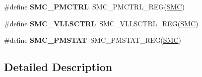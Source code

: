 \begin{DoxyCompactItemize}
\item 
\#define {\bfseries S\+M\+C\+\_\+\+P\+M\+C\+T\+RL}~S\+M\+C\+\_\+\+P\+M\+C\+T\+R\+L\+\_\+\+R\+EG(\hyperlink{group__SMC__Peripheral__Access__Layer_ga6667e81e5b32250febd3d46511d9309d}{S\+MC})\hypertarget{group__SMC__Register__Accessor__Macros_ga4b2bae0309aecee21e9fe70ac7dbe3dc}{}\label{group__SMC__Register__Accessor__Macros_ga4b2bae0309aecee21e9fe70ac7dbe3dc}

\item 
\#define {\bfseries S\+M\+C\+\_\+\+V\+L\+L\+S\+C\+T\+RL}~S\+M\+C\+\_\+\+V\+L\+L\+S\+C\+T\+R\+L\+\_\+\+R\+EG(\hyperlink{group__SMC__Peripheral__Access__Layer_ga6667e81e5b32250febd3d46511d9309d}{S\+MC})\hypertarget{group__SMC__Register__Accessor__Macros_gabc1de81f94174f2aaebdc6a51b782fee}{}\label{group__SMC__Register__Accessor__Macros_gabc1de81f94174f2aaebdc6a51b782fee}

\item 
\#define {\bfseries S\+M\+C\+\_\+\+P\+M\+S\+T\+AT}~S\+M\+C\+\_\+\+P\+M\+S\+T\+A\+T\+\_\+\+R\+EG(\hyperlink{group__SMC__Peripheral__Access__Layer_ga6667e81e5b32250febd3d46511d9309d}{S\+MC})\hypertarget{group__SMC__Register__Accessor__Macros_ga6311e0572e3a1f7d84e1069716b64307}{}\label{group__SMC__Register__Accessor__Macros_ga6311e0572e3a1f7d84e1069716b64307}

\end{DoxyCompactItemize}


\subsection{Detailed Description}
